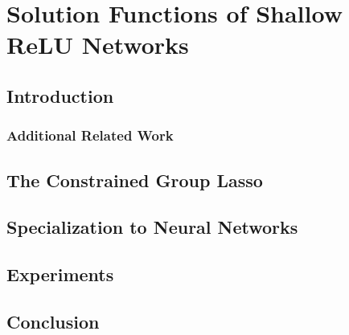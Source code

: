 
\chapter{Solution Functions of Shallow ReLU Networks}\label{chapter:solution-functions}

\section{Introduction}\label{sec:sol-fn-intro}



\subsection{Additional Related Work}\label{sec:sol-fn-related-work}



\section{The Constrained Group Lasso}\label{sec:cgl}



\section{Specialization to Neural Networks}\label{sec:specialization}



\section{Experiments}\label{sec:sol-fn-experiments}



\section{Conclusion}\label{sec:sol-fn-conclusion}



